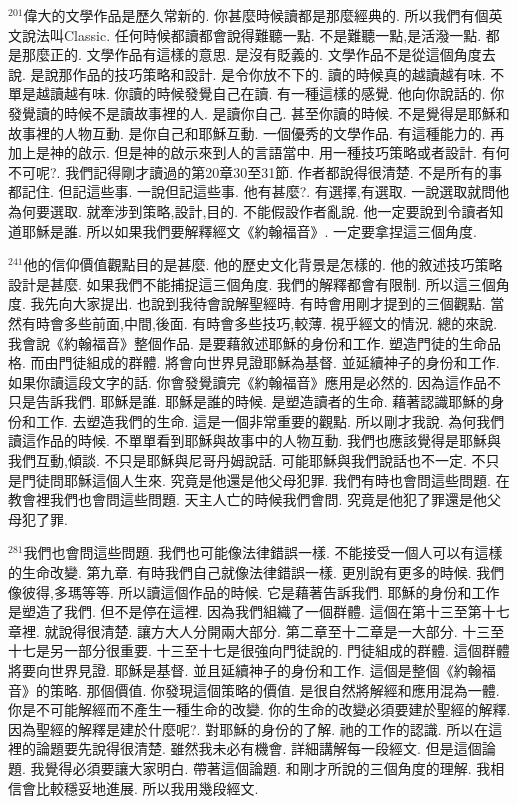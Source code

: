 \documentclass{book}
\begin{document}
$^{201}$偉大的文學作品是歷久常新的.
你甚麼時候讀都是那麼經典的.
所以我們有個英文說法叫Classic.
任何時候都讀都會說得難聽一點.
不是難聽一點,是活潑一點.
都是那麼正的.
文學作品有這樣的意思.
是沒有貶義的.
文學作品不是從這個角度去說.
是說那作品的技巧策略和設計.
是令你放不下的.
讀的時候真的越讀越有味.
不單是越讀越有味.
你讀的時候發覺自己在讀.
有一種這樣的感覺.
他向你說話的.
你發覺讀的時候不是讀故事裡的人.
是讀你自己.
甚至你讀的時候.
不是覺得是耶穌和故事裡的人物互動.
是你自己和耶穌互動.
一個優秀的文學作品.
有這種能力的.
再加上是神的啟示.
但是神的啟示來到人的言語當中.
用一種技巧策略或者設計.
有何不可呢?.
我們記得剛才讀過的第20章30至31節.
作者都說得很清楚.
不是所有的事都記住.
但記這些事.
一說但記這些事.
他有甚麼?.
有選擇,有選取.
一說選取就問他為何要選取.
就牽涉到策略,設計,目的.
不能假設作者亂說.
他一定要說到令讀者知道耶穌是誰.
所以如果我們要解釋經文《約翰福音》.
一定要拿捏這三個角度.

$^{241}$他的信仰價值觀點目的是甚麼.
他的歷史文化背景是怎樣的.
他的敘述技巧策略設計是甚麼.
如果我們不能捕捉這三個角度.
我們的解釋都會有限制.
所以這三個角度.
我先向大家提出.
也說到我待會說解聖經時.
有時會用剛才提到的三個觀點.
當然有時會多些前面,中間,後面.
有時會多些技巧,較薄.
視乎經文的情況.
總的來說.
我會說《約翰福音》整個作品.
是要藉敘述耶穌的身份和工作.
塑造門徒的生命品格.
而由門徒組成的群體.
將會向世界見證耶穌為基督.
並延續神子的身份和工作.
如果你讀這段文字的話.
你會發覺讀完《約翰福音》應用是必然的.
因為這作品不只是告訴我們.
耶穌是誰.
耶穌是誰的時候.
是塑造讀者的生命.
藉著認識耶穌的身份和工作.
去塑造我們的生命.
這是一個非常重要的觀點.
所以剛才我說.
為何我們讀這作品的時候.
不單單看到耶穌與故事中的人物互動.
我們也應該覺得是耶穌與我們互動,傾談.
不只是耶穌與尼哥丹姆說話.
可能耶穌與我們說話也不一定.
不只是門徒問耶穌這個人生來.
究竟是他還是他父母犯罪.
我們有時也會問這些問題.
在教會裡我們也會問這些問題.
天主人亡的時候我們會問.
究竟是他犯了罪還是他父母犯了罪.

$^{281}$我們也會問這些問題.
我們也可能像法律錯誤一樣.
不能接受一個人可以有這樣的生命改變.
第九章.
有時我們自己就像法律錯誤一樣.
更別說有更多的時候.
我們像彼得,多瑪等等.
所以讀這個作品的時候.
它是藉著告訴我們.
耶穌的身份和工作是塑造了我們.
但不是停在這裡.
因為我們組織了一個群體.
這個在第十三至第十七章裡.
就說得很清楚.
讓方大人分開兩大部分.
第二章至十二章是一大部分.
十三至十七是另一部分很重要.
十三至十七是很強向門徒說的.
門徒組成的群體.
這個群體將要向世界見證.
耶穌是基督.
並且延續神子的身份和工作.
這個是整個《約翰福音》的策略.
那個價值.
你發現這個策略的價值.
是很自然將解經和應用混為一體.
你是不可能解經而不產生一種生命的改變.
你的生命的改變必須要建於聖經的解釋.
因為聖經的解釋是建於什麼呢?.
對耶穌的身份的了解.
祂的工作的認識.
所以在這裡的論題要先說得很清楚.
雖然我未必有機會.
詳細講解每一段經文.
但是這個論題.
我覺得必須要讓大家明白.
帶著這個論題.
和剛才所說的三個角度的理解.
我相信會比較穩妥地進展.
所以我用幾段經文.
\end{document}
